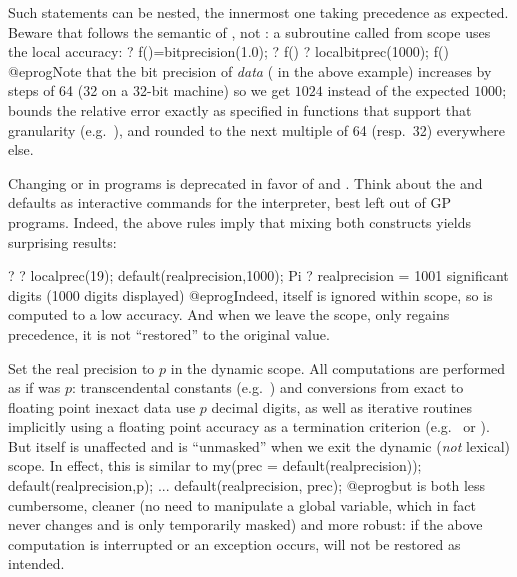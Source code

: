 Such  statements can be nested, the innermost one taking
precedence as expected. Beware that  follows the semantic of
, not : a subroutine called from  scope
uses the local accuracy:
\bprog
? f()=bitprecision(1.0);
? f()
? localbitprec(1000); f()
@eprog\noindent Note that the bit precision of \emph{data} ( in the
above example) increases by steps of 64 (32 on a 32-bit machine) so we get
$1024$ instead of the expected $1000$;  bounds the
relative error exactly as specified in functions that support that
granularity (e.g.~), and rounded to the next multiple of 64
(resp.~32) everywhere else.

 Changing  or 
in programs is deprecated in favor of  and
. Think about the  and
 defaults as interactive commands for the 
interpreter, best left out of GP programs. Indeed, the above rules imply that
mixing both constructs yields surprising results:

\bprog
? 
? localprec(19); default(realprecision,1000);  Pi
? \p
  realprecision = 1001 significant digits (1000 digits displayed)
@eprog\noindent Indeed,  itself is ignored within
 scope, so  is computed to a low accuracy. And when
we leave the  scope,  only regains precedence,
it is not ``restored'' to the original value.

\label{se:localprec}
Set the real precision to $p$ in the dynamic scope. All computations
are performed as if  was $p$:
transcendental constants (e.g.~) and
conversions from exact to floating point inexact data use $p$ decimal
digits, as well as iterative routines implicitly using a floating point
accuracy as a termination criterion (e.g.~ or ).
But  itself is unaffected
and is ``unmasked'' when we exit the dynamic (\emph{not} lexical) scope.
In effect, this is similar to
\bprog
my(prec = default(realprecision));
default(realprecision,p);
...
default(realprecision, prec);
@eprog\noindent but is both less cumbersome, cleaner (no need to manipulate
a global variable, which in fact never changes and is only temporarily masked)
and more robust: if the above computation is interrupted or an exception
occurs,  will not be restored as intended.

